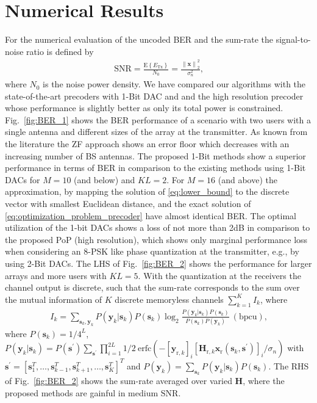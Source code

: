 \documentclass[journal,comsoc]{IEEEtran}
\begin{document}
\section{Numerical Results}
\label{sec:numerical_results}
For the numerical evaluation of the uncoded BER and the sum-rate the signal-to-noise ratio is defined by
\begin{align}
\mathrm{SNR}=\frac{\mathrm{E}\left\{ E_{\textrm{Tx}}  \right\}   }{N_0} =\frac{ \left\|\mathbf{x}\right\|^2_2 }{\sigma_n^2} \textrm{,}
\end{align}
where $N_0$ is the noise power density.
We have compared our algorithms with the state-of-the-art precoders with 1-Bit DAC \cite{Saxena_2016} and \cite{Jedda_2016} and the high resolution precoder \cite{Mo_2015} whose performance is slightly better as only its total power is constrained.
Fig.~\ref{fig:BER_1} shows the BER performance of a scenario with two users with a single antenna and different sizes of the array at the transmitter.
As known from the literature the ZF approach \cite{Saxena_2016} shows an error floor which decreases with an increasing number of BS antennas. The proposed 1-Bit methods show a superior performance in terms of BER in comparison to the existing methods using 1-Bit DACs for $M=10$ (and below) and $K L=2$.
For $M=16$ (and above) the approximation, by mapping the solution of \eqref{eq:lower_bound} to the discrete vector with smallest Euclidean distance, and the exact solution of \eqref{eq:optimization_problem_precoder} have almost identical BER.
The optimal utilization of the 1-bit DACs shows a loss of not more than \si{2}{dB} in comparison to the proposed PoP (high resolution), which shows only marginal performance loss when considering an 8-PSK like phase quantization at the transmitter, e.g., by using 2-Bit DACs. 
The LHS of Fig.~\ref{fig:BER_2} shows the performance for larger arrays and more users with $K L=5$.
With the quantization at the receivers the channel output is discrete, such that the sum-rate corresponds to the sum over the mutual information of $K$ discrete memoryless channels $\sum_{k=1}^{K} I_k $, where 
\begin{align}
I_k =  \sum_{\boldsymbol{s}_k, \boldsymbol{y}_k }  P(\boldsymbol{y}_k \vert \boldsymbol{s}_k)P(\boldsymbol{s}_k)  \log_2  \frac{ P(\boldsymbol{y}_k \vert \boldsymbol{s}_k)P(\boldsymbol{s}_k)  }{ P(\boldsymbol{s}_k) P(\boldsymbol{y}_k) }~(\textrm{bpcu}) \textrm{,}
\label{eq:sumRate}
\end{align} 
where $P(\boldsymbol{s}_k)=1/4^{L}$, $P(\boldsymbol{y}_k \vert \boldsymbol{s}_k)= P(\boldsymbol{s}^{\prime}) \sum_{\boldsymbol{s}^{\prime}}  \prod_{i=1}^{2L}  1/2~ \mathrm{erfc}( - [\boldsymbol{y}_{\textrm{r},k}]_i [\mathbf{H}_{\textrm{r},k}\boldsymbol{x}_{\textrm{r}}(\boldsymbol{s}_k,\boldsymbol{s}^{\prime})]_i / \sigma_n )$ with $\boldsymbol{s}^{\prime}=[\boldsymbol{s}_1^T,\ldots,\boldsymbol{s}_{k-1}^T,\boldsymbol{s}_{k+1}^T,\ldots,\boldsymbol{s}_{K}^T]^T$ and $P(\boldsymbol{y}_k)=\sum_{\boldsymbol{s}_k} P(\boldsymbol{y}_k \vert \boldsymbol{s}_k) P(\boldsymbol{s}_k)$.
The RHS of Fig.~\ref{fig:BER_2} shows the sum-rate averaged over varied $\mathbf{H}$, where the proposed methods are gainful in medium $\mathrm{SNR}$.
\end{document}
